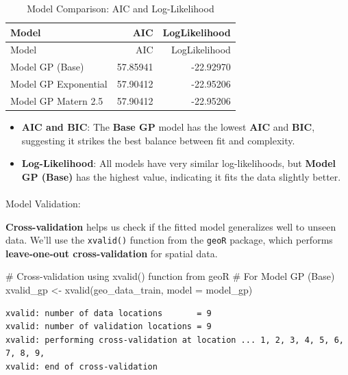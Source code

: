 \documentclass[
  11pt,
]{article}
\makeatletter
\let\oldparagraph\paragraph
\renewcommand{\paragraph}{
    \@ifstar
      \xxxParagraphStar
      \xxxParagraphNoStar
  }
\newcommand{\xxxParagraphStar}[1]{\oldparagraph*{#1}\mbox{}}
\newcommand{\xxxParagraphNoStar}[1]{\oldparagraph{#1}\mbox{}}
\newenvironment{Shaded}{\begin{snugshade}}{\end{snugshade}}
\newcommand{\AttributeTok}[1]{\textcolor[rgb]{0.40,0.45,0.13}{#1}}
\newcommand{\CommentTok}[1]{\textcolor[rgb]{0.37,0.37,0.37}{#1}}
\newcommand{\FunctionTok}[1]{\textcolor[rgb]{0.28,0.35,0.67}{#1}}
\newcommand{\NormalTok}[1]{\textcolor[rgb]{0.00,0.23,0.31}{#1}}
\newcommand{\OtherTok}[1]{\textcolor[rgb]{0.00,0.23,0.31}{#1}}
\providecommand{\tightlist}{%
  \setlength{\itemsep}{0pt}\setlength{\parskip}{0pt}}\usepackage{longtable,booktabs,array}
\makeatother
\begin{document}
\begin{longtable}[]{@{}lrr@{}}
\caption{Model Comparison: AIC and Log-Likelihood}\tabularnewline
\toprule\noalign{}
Model & AIC & LogLikelihood \\
\midrule\noalign{}
\endfirsthead
\toprule\noalign{}
Model & AIC & LogLikelihood \\
\midrule\noalign{}
\endhead
\bottomrule\noalign{}
\endlastfoot
Model GP (Base) & 57.85941 & -22.92970 \\
Model GP Exponential & 57.90412 & -22.95206 \\
Model GP Matern 2.5 & 57.90412 & -22.95206 \\
\end{longtable}

\begin{itemize}
\tightlist
\item
  \textbf{AIC and BIC}: The \textbf{Base GP} model has the lowest
  \textbf{AIC} and \textbf{BIC}, suggesting it strikes the best balance
  between fit and complexity.
\item
  \textbf{Log-Likelihood}: All models have very similar log-likelihoods,
  but \textbf{Model GP (Base)} has the highest value, indicating it fits
  the data slightly better.
\end{itemize}

\paragraph{Model Validation:}\label{model-validation-1}

\textbf{Cross-validation} helps us check if the fitted model generalizes
well to unseen data. We'll use the \texttt{xvalid()} function from the
\texttt{geoR} package, which performs \textbf{leave-one-out
cross-validation} for spatial data.

\begin{Shaded}
\begin{Highlighting}[]
\CommentTok{\# Cross{-}validation using xvalid() function from geoR}
\CommentTok{\# For Model GP (Base)}
\NormalTok{xvalid\_gp }\OtherTok{\textless{}{-}} \FunctionTok{xvalid}\NormalTok{(geo\_data\_train, }\AttributeTok{model =}\NormalTok{ model\_gp)}
\end{Highlighting}
\end{Shaded}

\begin{verbatim}
xvalid: number of data locations       = 9
xvalid: number of validation locations = 9
xvalid: performing cross-validation at location ... 1, 2, 3, 4, 5, 6, 7, 8, 9, 
xvalid: end of cross-validation
\end{verbatim}
\end{document}
